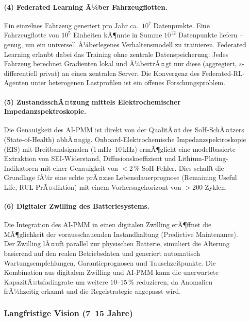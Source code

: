﻿\documentclass[12pt,a4paper]{article}
\begin{document}
	\paragraph{(4) Federated Learning Ã¼ber Fahrzeugflotten.}
	Ein einzelnes Fahrzeug generiert pro Jahr ca.\ $10^7$ Datenpunkte.
	Eine Fahrzeugflotte von $10^5$ Einheiten kÃ¶nnte in Summe $10^{12}$
	Datenpunkte liefern -- genug, um ein universell Ã¼berlegenes Verhaltensmodell
	zu trainieren. Federated Learning erlaubt dabei das Training ohne zentrale
	Datenspeicherung: Jedes Fahrzeug berechnet Gradienten lokal und Ã¼bertrÃ¤gt
	nur diese (aggregiert, $\varepsilon$-differentiell privat) an einen
	zentralen Server. Die Konvergenz des Federated-RL-Agenten unter
	heterogenen Lastprofilen ist ein offenes Forschungsproblem.
	
	\paragraph{(5) ZustandsschÃ¤tzung mittels Elektrochemischer Impedanzspektroskopie.}
	Die Genauigkeit des AI-PMM ist direkt von der QualitÃ¤t des SoH-SchÃ¤tzers
	(State-of-Health) abhÃ¤ngig. Onboard-Elektrochemische Impedanzspektroskopie
	(EIS) mit Breitbandsignalen ($1\,\mathrm{mHz}\text{--}10\,\mathrm{kHz}$)
	ermÃ¶glicht eine modellbasierte Extraktion von SEI-Widerstand, Diffusionskoeffizient
	und Lithium-Plating-Indikatoren mit einer Genauigkeit von $< 2\,\%$ SoH-Fehler.
	Dies schafft die Grundlage fÃ¼r eine echte prÃ¤zise Lebensdauerprognose
	(Remaining Useful Life, RUL-PrÃ¤diktion) mit einem Vorhersagehorizont von
	$> 200$ Zyklen.
	
	\paragraph{(6) Digitaler Zwilling des Batteriesystems.}
	Die Integration des AI-PMM in einen digitalen Zwilling erÃ¶ffnet die
	MÃ¶glichkeit der vorausschauenden Instandhaltung (Predictive Maintenance).
	Der Zwilling lÃ¤uft parallel zur physischen Batterie, simuliert die Alterung
	basierend auf den realen Betriebsdaten und generiert automatisch
	Wartungsempfehlungen, Garantieprognosen und Tauschzeitpunkte. Die Kombination
	aus digitalem Zwilling und AI-PMM kann die unerwartete KapazitÃ¤tsfadingrate
	um weitere $10\text{--}15\,\%$ reduzieren, da Anomalien frÃ¼hzeitig erkannt
	und die Regelstrategie angepasst wird.
	
	\subsubsection{Langfristige Vision (7--15 Jahre)}
	
\end{document}
